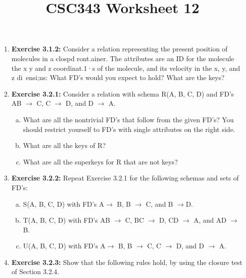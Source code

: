 \documentclass[12pt]{article}
\begin{document}
\title{CSC343 Worksheet 12}
\maketitle

\begin{enumerate}[1.]
    \item \textbf{Exercise 3.1.2:} Consider a relation representing the present position of molecules
    in a clospd ront.ainer. The attributes are an ID for the molecule the x y
    and z coordinat.1·s of the molecule, and its velocity in the x, y, and z di~ensi;ns:
    What FD's would you expect to hold? What are the keys?

    \item \textbf{Exercise 3.2.1:} Consider a relation with schema R(A, B, C, D) and FD's
    AB $\to$ C, C $\to$ D, and D $\to$ A.

    \begin{enumerate}[a)]
        \item What are all the nontrivial FD's that follow from the given FD's? You should restrict yourself to FD's with single attributes on the right side.
        \item What are all the keys of R?
        \item What are all the superkeys for R that are not keys?
    \end{enumerate}

    \item \textbf{Exercise 3.2.2:} Repeat Exercise 3.2.1 for the following schemas and sets of
    FD's:

    \begin{enumerate}[a)]
        \item S(A, B, C, D) with FD's A$\to$ B, B $\to$ C, and B $\to$D.
        \item T(A, B, C, D) with FD's AB $\to$ C, BC $\to$ D, CD $\to$ A, and AD $\to$ B.
        \item U(A, B, C, D) with FD's A$\to$ B, B $\to$ C, C $\to$ D, and D $\to$ A.
    \end{enumerate}

    \item \textbf{Exercise 3.2.3:} Show that the following rules hold, by using the closure test
    of Section 3.2.4.

    \bigskip


\end{enumerate}
\end{document}

